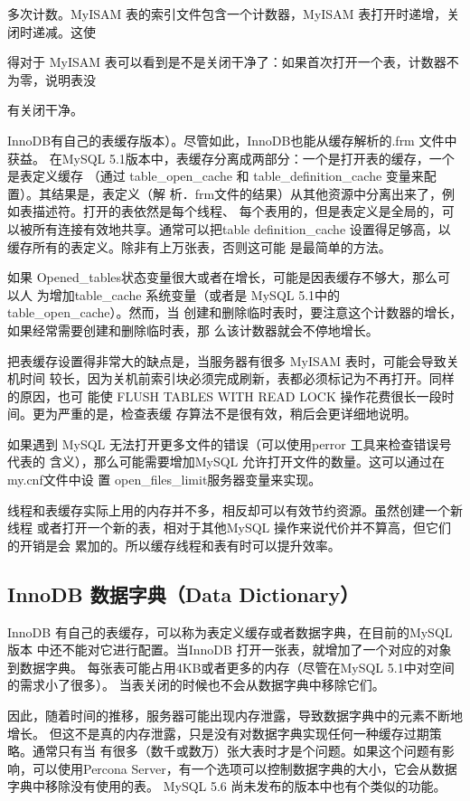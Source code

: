 多次计数。MyISAM 表的索引文件包含一个计数器，MyISAM 表打开时递增，关闭时递减。这使

得对于 MyISAM 表可以看到是不是关闭干净了：如果首次打开一个表，计数器不为零，说明表没

有关闭干净。

InnoDB有自己的表缓存版本）。尽管如此，InnoDB也能从缓存解析的.frm 文件中获益。
在MySQL 5.1版本中，表缓存分离成两部分：一个是打开表的缓存，一个是表定义缓存
（通过 table\_open\_cache 和 table\_definition\_cache 变量来配置）。其结果是，表定义（解
析．frm文件的结果）从其他资源中分离出来了，例如表描述符。打开的表依然是每个线程、
每个表用的，但是表定义是全局的，可以被所有连接有效地共享。通常可以把table
definition\_cache 设置得足够高，以缓存所有的表定义。除非有上万张表，否则这可能
是最简单的方法。

如果 Opened\_tables状态变量很大或者在增长，可能是因表缓存不够大，那么可以人
为增加table\_cache 系统变量（或者是 MySQL 5.1中的 table\_open\_cache）。然而，当
创建和删除临时表时，要注意这个计数器的增长，如果经常需要创建和删除临时表，那
么该计数器就会不停地增长。

把表缓存设置得非常大的缺点是，当服务器有很多 MyISAM 表时，可能会导致关机时间
较长，因为关机前索引块必须完成刷新，表都必须标记为不再打开。同样的原因，也可
能使 FLUSH TABLES WITH READ LOCK 操作花费很长一段时间。更为严重的是，检查表缓
存算法不是很有效，稍后会更详细地说明。

如果遇到 MySQL 无法打开更多文件的错误（可以使用perror 工具来检查错误号代表的
含义），那么可能需要增加MySQL 允许打开文件的数量。这可以通过在my.cnf文件中设
置 open\_files\_limit服务器变量来实现。

线程和表缓存实际上用的内存并不多，相反却可以有效节约资源。虽然创建一个新线程
或者打开一个新的表，相对于其他MySQL 操作来说代价并不算高，但它们的开销是会
累加的。所以缓存线程和表有时可以提升效率。

\subsection{InnoDB 数据字典（Data Dictionary）}
InnoDB 有自己的表缓存，可以称为表定义缓存或者数据字典，在目前的MySQL版本
中还不能对它进行配置。当InnoDB 打开一张表，就增加了一个对应的对象到数据字典。
每张表可能占用4KB或者更多的内存（尽管在MySQL 5.1中对空间的需求小了很多）。
当表关闭的时候也不会从数据字典中移除它们。

因此，随着时间的推移，服务器可能出现内存泄露，导致数据字典中的元素不断地增长。
但这不是真的内存泄露，只是没有对数据字典实现任何一种缓存过期策略。通常只有当
有很多（数千或数万）张大表时才是个问题。如果这个问题有影响，可以使用Percona
Server，有一个选项可以控制数据字典的大小，它会从数据字典中移除没有使用的表。
MySQL 5.6 尚未发布的版本中也有个类似的功能。

